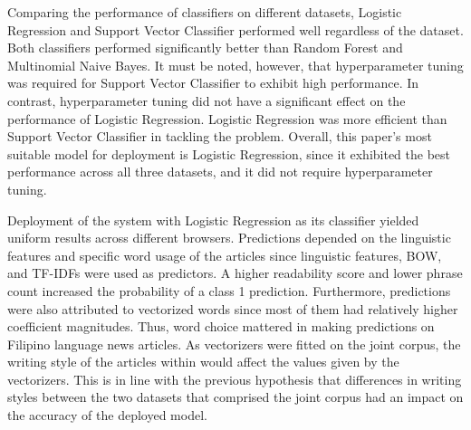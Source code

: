 Comparing the performance of classifiers on different datasets, Logistic Regression and Support Vector Classifier performed well regardless of the dataset. Both classifiers performed significantly better than Random Forest and Multinomial Naive Bayes. It must be noted, however, that hyperparameter tuning was required for Support Vector Classifier to exhibit high performance. In contrast, hyperparameter tuning did not have a significant effect on the performance of Logistic Regression. Logistic Regression was more efficient than Support Vector Classifier in tackling the problem. Overall, this paper's most suitable model for deployment is Logistic Regression, since it exhibited the best performance across all three datasets, and it did not require hyperparameter tuning.

Deployment of the system with Logistic Regression as its classifier yielded uniform results across different browsers. Predictions depended on the linguistic features and specific word usage of the articles since linguistic features, BOW, and TF-IDFs were used as predictors. A higher readability score and lower phrase count increased the probability of a class 1 prediction. Furthermore, predictions were also attributed to vectorized words since most of them had relatively higher coefficient magnitudes. Thus, word choice mattered in making predictions on Filipino language news articles. As vectorizers were fitted on the joint corpus, the writing style of the articles within would affect the values given by the vectorizers. This is in line with the previous hypothesis that differences in writing styles between the two datasets that comprised the joint corpus had an impact on the accuracy of the deployed model.